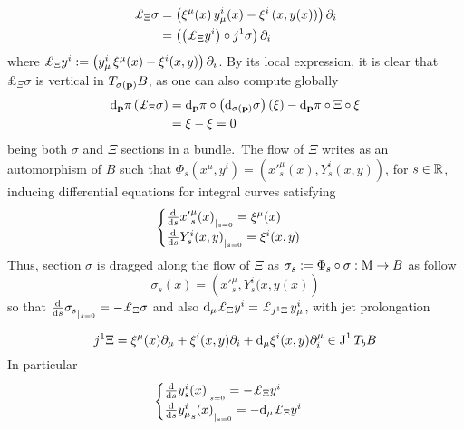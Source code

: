 \begin{equation}\label{lie_der}
    \begin{split}
        \pounds_\Xi\sigma&=\left(\xi^\mu(x)\,y^i_\mu(x)-\xi^i\left(x,y(x)\right)\right)\der_i\\
        &=\left(\left(\pounds_\Xi y^i\right)\circ j^1\sigma\right)\der_i
    \end{split}
\end{equation}
where $\pounds_\Xi y^i:=\left(y^i_\mu\,\xi^\mu(x)-\xi^i(x,y)\right)\der_i$. By its local expression, it is clear that $\pounds_\Xi\sigma$ is vertical in $T_{\sigma(\mathbf{p})}B$, as one can also compute globally
\begin{align*}
\d_\p\pi\left(\pounds_\Xi\sigma\right)&=\d_\p\pi\circ\left(\d_{\sigma(\p)}\sigma\right)(\xi)-\d_\p\pi\circ\Xi\circ\xi\\
    &=\xi-\xi=0
\end{align*}
being both $\sigma$ and $\Xi$ sections in a bundle.\, The flow of $\Xi$ writes as an automorphism of $B$ such that $\Phi_s(x^\mu,y^i)=({x'}^\mu_s(x),Y^i_s(x,y))$, for $s\in\mathbb{R}$, inducing differential equations for integral curves satisfying
$$\begin{cases}
    {\frac{\text{\normalfont d}}{\text{\normalfont d}s}{x'}^\mu_s(x)}_{|_{s=0}}=\xi^\mu(x)\\
    {\frac{\text{\normalfont d}}{\text{\normalfont d} s}Y^i_s(x,y)}_{|_{s=0}}=\xi^i(x,y)
\end{cases}$$
Thus, section $\sigma$ is dragged along the flow of $\Xi$ as $\sigma_s:=\Phi_s\circ\sigma:\text{\normalfont M}\to B$ as follow
$$\sigma_s(x)=\left({x'}^\mu_s,Y^i_s(x,y(x)\right)$$
so that
${\frac{\d}{\d s}\sigma_s}_{|_{s=0}}=-\pounds_\Xi\sigma$ and also $\d_\mu\pounds_\Xi y^i=\pounds_{j^1\Xi}\,
y^i_\mu$, with jet prolongation 

$$j^1\Xi=\xi^\mu(x)\partial_\mu+\xi^i(x,y)\partial_i+\text{\normalfont d}_\mu\xi^i(x,y)\partial_i^\mu\in\text{\normalfont J}^1\,T_bB$$
In particular
$$\begin{cases}
    {\frac{\d}{\d s}{y}^i_s(x)}_{|_{s=0}}=-\pounds_\Xi y^i\\
    {\frac{\d}{\d s}{y^i_\mu}_s(x)}_{|_{s=0}}=-\d_\mu\pounds_\Xi y^i
\end{cases}$$


\newpage
